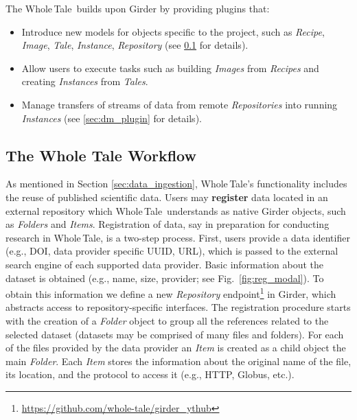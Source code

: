 \documentclass[review]{elsarticle}
\newcommand{\wt}{Whole\,Tale}
\begin{document}
The \wt\ builds upon Girder by providing plugins that:
\begin{itemize}
  \item Introduce new models for objects specific to the
    project, such as \emph{Recipe}, \emph{Image}, \emph{Tale}, \emph{Instance},
    \emph{Repository} (see \ref{sec:wt_plugin} for details).
  \item Allow users to execute tasks such as building \emph{Images} from
    \emph{Recipes} and creating \emph{Instances} from \emph{Tales}.
  \item Manage transfers of streams of data from remote \emph{Repositories} into
    running \emph{Instances} (see \ref{sec:dm_plugin} for details).
\end{itemize}

\subsection{The Whole Tale Workflow}
\label{sec:wt_plugin}
As mentioned in Section \ref{sec:data_ingestion}, \wt's functionality includes the reuse of published scientific data. Users may {\bf register} data located
in an external repository which \wt\ understands as native Girder objects, such as \emph{Folders} and
\emph{Items}. Registration of data, say in preparation for conducting research in \wt, is a two-step process. First, users provide a data
identifier (e.g., DOI, data provider specific UUID, URL), which is passed to the external search
engine of each supported data provider. Basic information about the dataset is obtained (e.g., name, size, provider; see
Fig.~\ref{fig:reg_modal}). To obtain this information we define a new
\emph{Repository} endpoint\footnote{\url{https://github.com/whole-tale/girder_ythub}} in Girder, which abstracts access to repository-specific interfaces.
The registration procedure starts with the creation of a
\emph{Folder} object to group all the references related to the
selected dataset (datasets may be comprised of many files and folders). 
For each of the files provided by the data provider an \emph{Item} is
created as a child object the main \emph{Folder}. Each \emph{Item} stores the
information about the original name of the file, its location, and the protocol to
access it (e.g., HTTP, Globus, etc.).
\end{document}
